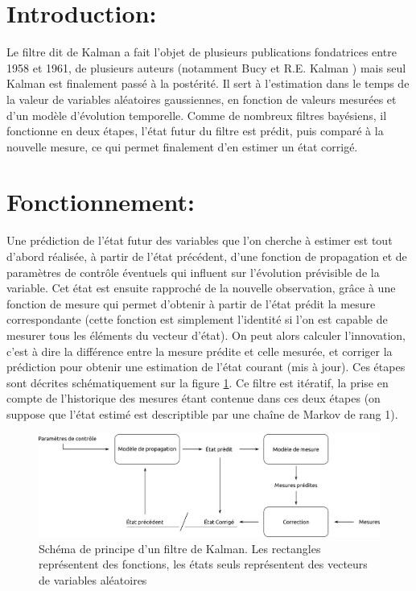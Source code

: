 \section{Introduction:}
Le filtre dit de Kalman a fait l'objet de plusieurs publications fondatrices entre 1958 et 1961, de plusieurs auteurs (notamment Bucy et R.E. Kalman \cite{Kalman1960a, Kalman1961}) mais seul Kalman est finalement passé à la postérité. Il sert à l'estimation dans le temps de la valeur de variables aléatoires gaussiennes, en fonction de valeurs mesurées et d'un modèle d'évolution temporelle. Comme de nombreux filtres bayésiens, il fonctionne en deux étapes, l'état futur du filtre est prédit, puis comparé à la nouvelle mesure, ce qui permet finalement d'en estimer un état corrigé. 

\section{Fonctionnement:}
Une prédiction de l'état futur des variables que l'on cherche à estimer est tout d'abord réalisée, à partir de l'état précédent, d'une fonction de propagation et de paramètres de contrôle éventuels qui influent sur l'évolution prévisible de la variable. Cet état est ensuite rapproché de la nouvelle observation, grâce à une fonction de mesure qui permet d'obtenir à partir de l'état prédit la mesure correspondante (cette fonction est simplement l'identité si l'on est capable de mesurer tous les éléments du vecteur d'état). On peut alors calculer l'innovation, c'est à dire la différence entre la mesure prédite et celle mesurée, et corriger la prédiction pour obtenir une estimation de l'état courant (mis à jour). Ces étapes sont décrites schématiquement sur la figure \ref{fig:ch4_kalman_overview}. Ce filtre est itératif, la prise en compte de l'historique des mesures étant contenue dans ces deux étapes (on suppose que l'état estimé est descriptible par une chaîne de Markov de rang 1).\\

\begin{figure}
	\centering
	\includegraphics[width=\textwidth]{Chapter4/graphics/kalman_filter_overview.png}
	\caption{Schéma de principe d'un filtre de Kalman. Les rectangles représentent des fonctions, les états seuls représentent des vecteurs de variables aléatoires}
	\label{fig:ch4_kalman_overview}
\end{figure}

